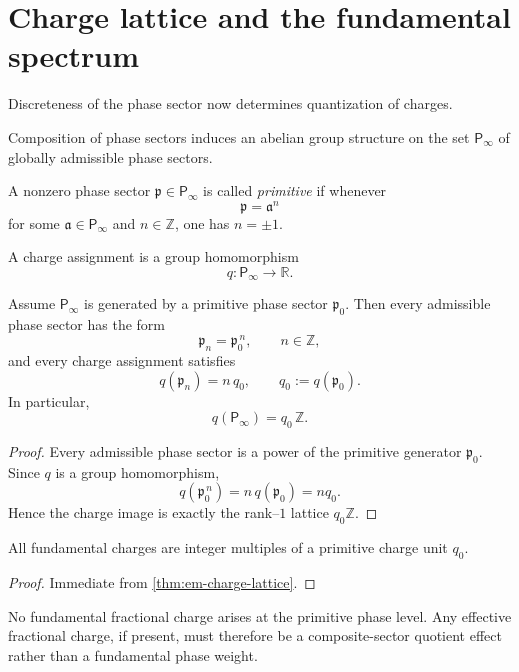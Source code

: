 \section{Charge lattice and the fundamental spectrum}
\label{sec:em-charge-lattice}
Discreteness of the phase sector now determines quantization of charges.
\begin{definition}
	Composition of phase sectors induces an abelian group structure on the
	set \(\mathsf P_\infty\) of globally admissible phase sectors.
\end{definition}
\begin{definition}
	A nonzero phase sector \(\mathfrak p\in \mathsf P_\infty\) is called
	\emph{primitive} if whenever
	\[
		\mathfrak p=\mathfrak a^n
	\]
	for some \(\mathfrak a\in \mathsf P_\infty\) and \(n\in\mathbb Z\), one
	has \(n=\pm1\).
\end{definition}
\begin{definition}
	A charge assignment is a group homomorphism
	\[
		q:\mathsf P_\infty\to \mathbb R.
	\]
\end{definition}
\begin{theorem}
	\label{thm:em-charge-lattice}
	Assume \(\mathsf P_\infty\) is generated by a primitive phase sector
	\(\mathfrak p_0\).
	Then every admissible phase sector has the form
	\[
		\mathfrak p_n=\mathfrak p_0^{\,n},
		\qquad n\in\mathbb Z,
	\]
	and every charge assignment satisfies
	\[
		q(\mathfrak p_n)=n\,q_0,
		\qquad q_0:=q(\mathfrak p_0).
	\]
	In particular,
	\[
		q(\mathsf P_\infty)=q_0\,\mathbb Z.
	\]
\end{theorem}
\begin{proof}
	Every admissible phase sector is a power of the primitive generator
	\(\mathfrak p_0\).
	Since \(q\) is a group homomorphism,
	\[
		q(\mathfrak p_0^{\,n})=n\,q(\mathfrak p_0)=nq_0.
	\]
	Hence the charge image is exactly the rank--\(1\) lattice
	\(q_0\mathbb Z\).
\end{proof}
\begin{corollary}
	All fundamental charges are integer multiples of a primitive charge unit
	\(q_0\).
\end{corollary}
\begin{proof}
	Immediate from \cref{thm:em-charge-lattice}.
\end{proof}
\begin{remark}
	No fundamental fractional charge arises at the primitive phase level.
	Any effective fractional charge, if present, must therefore be a
	composite-sector quotient effect rather than a fundamental phase
	weight.
\end{remark}
